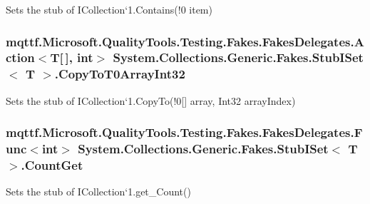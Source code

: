 Sets the stub of I\-Collection`1.Contains(!0 item)

\hypertarget{class_system_1_1_collections_1_1_generic_1_1_fakes_1_1_stub_i_set_3_01_t_01_4_a0201d36a56ffce541378bd87bcfdb0e8}{
\subsubsection[{Copy\-To\-T0\-Array\-Int32}]{\setlength{\rightskip}{0pt plus 5cm}mqttf.\-Microsoft.\-Quality\-Tools.\-Testing.\-Fakes.\-Fakes\-Delegates.\-Action$<$T\mbox{[}$\,$\mbox{]}, int$>$ System.\-Collections.\-Generic.\-Fakes.\-Stub\-I\-Set$<$ T $>$.Copy\-To\-T0\-Array\-Int32}}\label{class_system_1_1_collections_1_1_generic_1_1_fakes_1_1_stub_i_set_3_01_t_01_4_a0201d36a56ffce541378bd87bcfdb0e8}


Sets the stub of I\-Collection`1.Copy\-To(!0\mbox{[}\mbox{]} array, Int32 array\-Index)

\hypertarget{class_system_1_1_collections_1_1_generic_1_1_fakes_1_1_stub_i_set_3_01_t_01_4_a2e2c3aa4427d982cb70e2567b2f63c10}{
\subsubsection[{Count\-Get}]{\setlength{\rightskip}{0pt plus 5cm}mqttf.\-Microsoft.\-Quality\-Tools.\-Testing.\-Fakes.\-Fakes\-Delegates.\-Func$<$int$>$ System.\-Collections.\-Generic.\-Fakes.\-Stub\-I\-Set$<$ T $>$.Count\-Get}}\label{class_system_1_1_collections_1_1_generic_1_1_fakes_1_1_stub_i_set_3_01_t_01_4_a2e2c3aa4427d982cb70e2567b2f63c10}


Sets the stub of I\-Collection`1.get\-\_\-\-Count()

